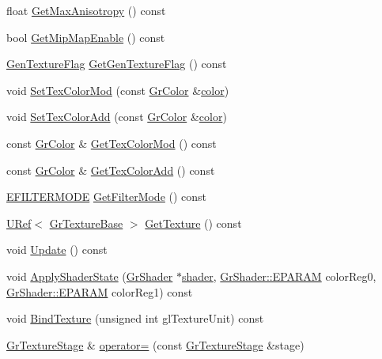 \begin{CompactItemize}
\begin{CompactItemize}
\item 
float \hyperlink{class_gr_texture_stage_426da5e8a0ae8225728c287a4d2abdd8}{GetMaxAnisotropy} () const 
\item 
bool \hyperlink{class_gr_texture_stage_216e2a31963f9e4f10096c0c42795279}{GetMipMapEnable} () const 
\item 
\hyperlink{class_gr_texture_stage_60f59a039bf1c95b76659752ff1bf7d6}{GenTextureFlag} \hyperlink{class_gr_texture_stage_b402fe22422a4bd70bb8ae1350a7eb14}{GetGenTextureFlag} () const 
\item 
void \hyperlink{class_gr_texture_stage_1803888bbf5d820f060465bd63bf88bd}{SetTexColorMod} (const \hyperlink{class_gr_color}{GrColor} \&\hyperlink{glext_8h_3ea846f998d64f079b86052b6c4193a8}{color})
\item 
void \hyperlink{class_gr_texture_stage_6dc007a985aac8227b9e445829d42756}{SetTexColorAdd} (const \hyperlink{class_gr_color}{GrColor} \&\hyperlink{glext_8h_3ea846f998d64f079b86052b6c4193a8}{color})
\item 
const \hyperlink{class_gr_color}{GrColor} \& \hyperlink{class_gr_texture_stage_593eb3d965cd99ca91b4e09127a892e6}{GetTexColorMod} () const 
\item 
const \hyperlink{class_gr_color}{GrColor} \& \hyperlink{class_gr_texture_stage_be60ecb1b07e9e3765c5c5119eaa114f}{GetTexColorAdd} () const 
\item 
\hyperlink{class_gr_texture_stage_b86144a2e97311bb975db7c2c361f048}{EFILTERMODE} \hyperlink{class_gr_texture_stage_e2e876d39b788ceb501e17c0ea51eae0}{GetFilterMode} () const 
\item 
\hyperlink{class_u_ref}{URef}$<$ \hyperlink{class_gr_texture_base}{GrTextureBase} $>$ \hyperlink{class_gr_texture_stage_89083b0faeed97261a4ae0feb512fc8b}{GetTexture} () const 
\item 
void \hyperlink{class_gr_texture_stage_72dad18b9bc9adbad72138920b6e7fdf}{Update} () const 
\item 
void \hyperlink{class_gr_texture_stage_f8e83134d46afc43e868f5069b065e29}{ApplyShaderState} (\hyperlink{class_gr_shader}{GrShader} $\ast$\hyperlink{glext_8h_57b2a96adb1d51204909a82d861e395e}{shader}, \hyperlink{class_gr_shader_2f004c603bb97711d05eb68381a5a7ba}{GrShader::EPARAM} colorReg0, \hyperlink{class_gr_shader_2f004c603bb97711d05eb68381a5a7ba}{GrShader::EPARAM} colorReg1) const 
\item 
void \hyperlink{class_gr_texture_stage_485314fd955bae3e4b6c2c228381b8f6}{BindTexture} (unsigned int glTextureUnit) const 
\item 
\hyperlink{class_gr_texture_stage}{GrTextureStage} \& \hyperlink{class_gr_texture_stage_078a1d7c0fa18ab8a73bcad6ee5037ae}{operator=} (const \hyperlink{class_gr_texture_stage}{GrTextureStage} \&stage)
\end{CompactItemize}

\end{CompactItemize}
